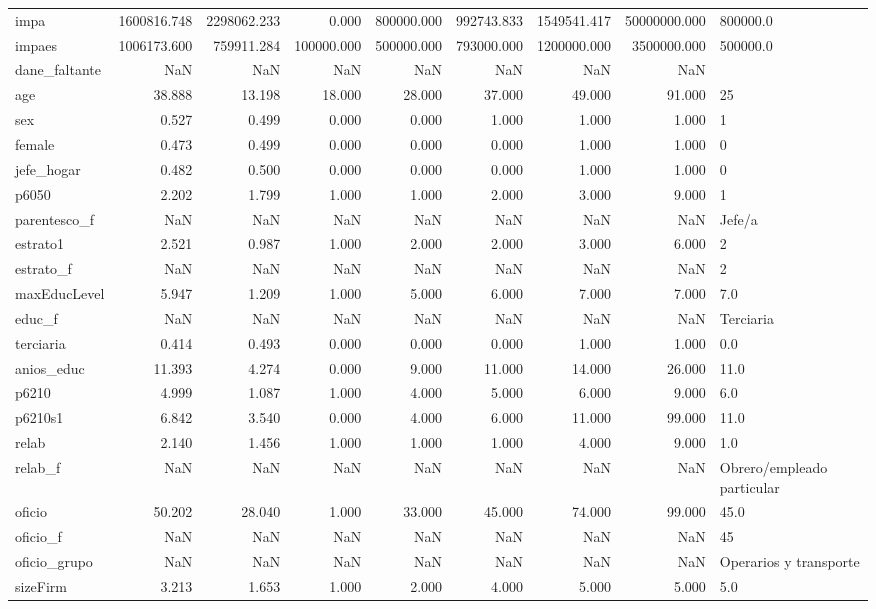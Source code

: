 \begin{longtable}{lrrrrrrrl}
impa & 1600816.748 & 2298062.233 & 0.000 & 800000.000 & 992743.833 & 1549541.417 & 50000000.000 & 800000.0 \\
impaes & 1006173.600 & 759911.284 & 100000.000 & 500000.000 & 793000.000 & 1200000.000 & 3500000.000 & 500000.0 \\
dane\_faltante & NaN & NaN & NaN & NaN & NaN & NaN & NaN &  \\
age & 38.888 & 13.198 & 18.000 & 28.000 & 37.000 & 49.000 & 91.000 & 25 \\
sex & 0.527 & 0.499 & 0.000 & 0.000 & 1.000 & 1.000 & 1.000 & 1 \\
female & 0.473 & 0.499 & 0.000 & 0.000 & 0.000 & 1.000 & 1.000 & 0 \\
jefe\_hogar & 0.482 & 0.500 & 0.000 & 0.000 & 0.000 & 1.000 & 1.000 & 0 \\
p6050 & 2.202 & 1.799 & 1.000 & 1.000 & 2.000 & 3.000 & 9.000 & 1 \\
parentesco\_f & NaN & NaN & NaN & NaN & NaN & NaN & NaN & Jefe/a \\
estrato1 & 2.521 & 0.987 & 1.000 & 2.000 & 2.000 & 3.000 & 6.000 & 2 \\
estrato\_f & NaN & NaN & NaN & NaN & NaN & NaN & NaN & 2 \\
maxEducLevel & 5.947 & 1.209 & 1.000 & 5.000 & 6.000 & 7.000 & 7.000 & 7.0 \\
educ\_f & NaN & NaN & NaN & NaN & NaN & NaN & NaN & Terciaria \\
terciaria & 0.414 & 0.493 & 0.000 & 0.000 & 0.000 & 1.000 & 1.000 & 0.0 \\
anios\_educ & 11.393 & 4.274 & 0.000 & 9.000 & 11.000 & 14.000 & 26.000 & 11.0 \\
p6210 & 4.999 & 1.087 & 1.000 & 4.000 & 5.000 & 6.000 & 9.000 & 6.0 \\
p6210s1 & 6.842 & 3.540 & 0.000 & 4.000 & 6.000 & 11.000 & 99.000 & 11.0 \\
relab & 2.140 & 1.456 & 1.000 & 1.000 & 1.000 & 4.000 & 9.000 & 1.0 \\
relab\_f & NaN & NaN & NaN & NaN & NaN & NaN & NaN & Obrero/empleado particular \\
oficio & 50.202 & 28.040 & 1.000 & 33.000 & 45.000 & 74.000 & 99.000 & 45.0 \\
oficio\_f & NaN & NaN & NaN & NaN & NaN & NaN & NaN & 45 \\
oficio\_grupo & NaN & NaN & NaN & NaN & NaN & NaN & NaN & Operarios y transporte \\
sizeFirm & 3.213 & 1.653 & 1.000 & 2.000 & 4.000 & 5.000 & 5.000 & 5.0 \\

\end{longtable}

